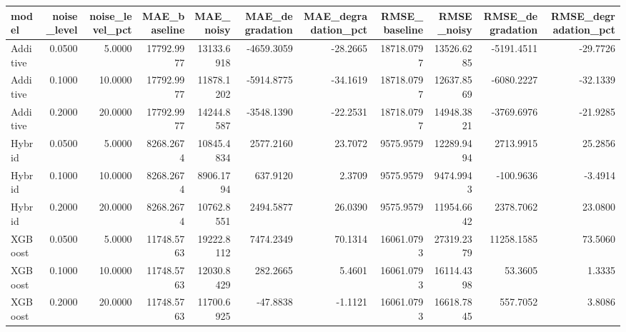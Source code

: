 \begin{tabular}{lrrrrrrrrrr}
\toprule
model & noise_level & noise_level_pct & MAE_baseline & MAE_noisy & MAE_degradation & MAE_degradation_pct & RMSE_baseline & RMSE_noisy & RMSE_degradation & RMSE_degradation_pct \\
\midrule
Additive & 0.0500 & 5.0000 & 17792.9977 & 13133.6918 & -4659.3059 & -28.2665 & 18718.0797 & 13526.6285 & -5191.4511 & -29.7726 \\
Additive & 0.1000 & 10.0000 & 17792.9977 & 11878.1202 & -5914.8775 & -34.1619 & 18718.0797 & 12637.8569 & -6080.2227 & -32.1339 \\
Additive & 0.2000 & 20.0000 & 17792.9977 & 14244.8587 & -3548.1390 & -22.2531 & 18718.0797 & 14948.3821 & -3769.6976 & -21.9285 \\
Hybrid & 0.0500 & 5.0000 & 8268.2674 & 10845.4834 & 2577.2160 & 23.7072 & 9575.9579 & 12289.9494 & 2713.9915 & 25.2856 \\
Hybrid & 0.1000 & 10.0000 & 8268.2674 & 8906.1794 & 637.9120 & 2.3709 & 9575.9579 & 9474.9943 & -100.9636 & -3.4914 \\
Hybrid & 0.2000 & 20.0000 & 8268.2674 & 10762.8551 & 2494.5877 & 26.0390 & 9575.9579 & 11954.6642 & 2378.7062 & 23.0800 \\
XGBoost & 0.0500 & 5.0000 & 11748.5763 & 19222.8112 & 7474.2349 & 70.1314 & 16061.0793 & 27319.2379 & 11258.1585 & 73.5060 \\
XGBoost & 0.1000 & 10.0000 & 11748.5763 & 12030.8429 & 282.2665 & 5.4601 & 16061.0793 & 16114.4398 & 53.3605 & 1.3335 \\
XGBoost & 0.2000 & 20.0000 & 11748.5763 & 11700.6925 & -47.8838 & -1.1121 & 16061.0793 & 16618.7845 & 557.7052 & 3.8086 \\
\bottomrule
\end{tabular}
